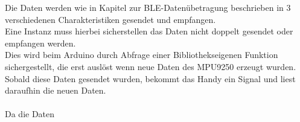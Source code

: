 Die Daten werden wie in Kapitel zur BLE-Datenübetragung beschrieben in 
3 verschiedenen Charakteristiken gesendet und empfangen. \\
Eine Instanz muss hierbei sicherstellen das Daten
nicht doppelt gesendet oder empfangen werden.\\
Dies wird beim Arduino durch Abfrage einer Bibliothekseigenen Funktion
sichergestellt, die erst auslöst wenn neue Daten des MPU9250 erzeugt wurden.\\
Sobald diese Daten gesendet wurden, bekommt das Handy ein Signal und liest
daraufhin die neuen Daten.\\
\\
Da die Daten 